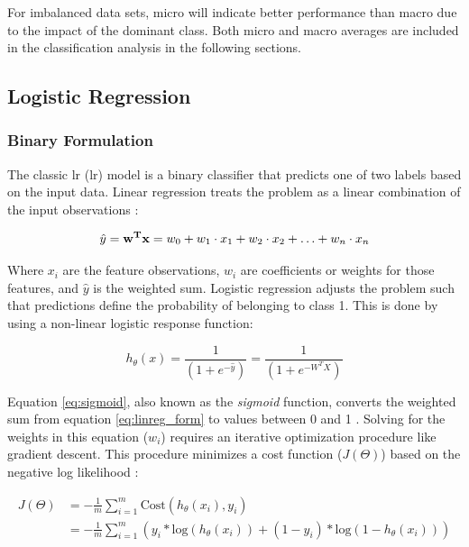 For imbalanced data sets, micro will indicate better performance than macro due to the impact of the dominant class. Both micro and macro averages are included in the classification analysis in the following sections.

\subsection{Logistic Regression} \label{ch5:log_reg}

\subsubsection{Binary Formulation} 

The classic \acrlong{lr} (\acrshort{lr}) model is a binary classifier that predicts one of two labels based on the input data. Linear regression treats the problem as a linear combination of the input observations \citep[p.\ 369]{bertsimas_analytics_2016}:

\begin{equation}
\label{eq:linreg_form}
    \hat{y} = {\bf{w^Tx}} = w_0 + w_1 \cdot x_1 + w_2 \cdot x_2 + \ldots + w_n \cdot x_n 
\end{equation}

Where $x_i$ are the feature observations, $w_i$ are coefficients or weights for those features, and $\hat{y}$ is the weighted sum. Logistic regression adjusts the problem such that predictions define the probability of belonging to class 1. This is done by using a non-linear logistic response function: 

\begin{equation}
\label{eq:sigmoid}
h_{\theta}(x) = \frac{1}{(1+e^{-\hat{y}})} = \frac{1}{(1+e^{-W^TX})}
\end{equation}

Equation \ref{eq:sigmoid}, also known as the \textit{sigmoid} function, converts the weighted sum from equation \ref{eq:linreg_form} to values between 0 and 1 \citep[p.\ 369]{bertsimas_analytics_2016}. Solving for the weights in this equation ($w_i$) requires an iterative optimization procedure like gradient descent. This procedure minimizes a cost function ($J(\Theta)$) based on the negative log likelihood \citep{ng_logistic_2011}:

\begin{equation}
\label{eq:logreg_cost}
\begin{aligned}
        J(\Theta) &= -\frac{1}{m} \sum_{i=1}^{m}{\text{Cost}(h_{\theta}(x_i),y_i)} \\ &= -\frac{1}{m}\sum_{i=1}^{m}{(y_i*\text{log}({h_{\theta}(x_i)})+(1-y_i)*\text{log}(1-h_{\theta}(x_i)))}
\end{aligned}
\end{equation}

